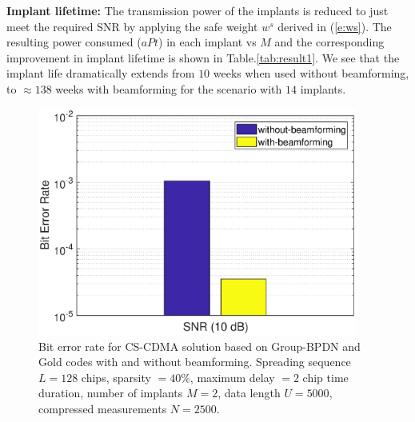 \noindent \textbf{Implant lifetime:}
The transmission power of the implants is reduced to just meet the required SNR by applying the safe weight $w^s$ derived in (\ref{e:ws}). The resulting power consumed ($aPt$) in each implant vs $M$ and the corresponding improvement in implant lifetime is shown in Table.\ref{tab:result1}. %
We see that the implant life dramatically extends from $10$ weeks when used without beamforming, to $\approx 138$ weeks with beamforming for the scenario with $14$ implants.	
  
\begin{figure}
	\centering
	\includegraphics[width=10.5cm,height=7.5cm]{figures/GC_beamforming/sensor2delay2_beamforming_bar.eps}
	\caption{Bit error rate for CS-CDMA solution based on Group-BPDN and Gold codes with and without beamforming. Spreading sequence $L = 128$ chips, sparsity $= 40 \%$, maximum delay $= 2$ chip time duration, number of implants $M = 2$, data length $U = 5000$, compressed measurements $N = 2500$.}
	\label{Fig_result0}
	\vspace{-2mm}
\end{figure}

